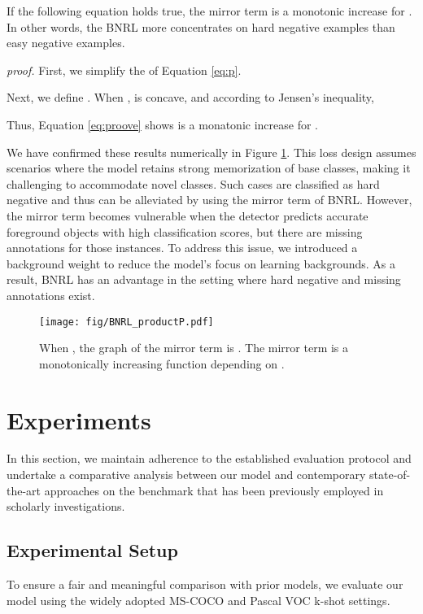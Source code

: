 \documentclass{article}
\begin{document}
If the following equation holds true, the mirror term is a monotonic increase for .
In other words, the BNRL more concentrates on hard negative examples than easy negative examples.



{\it proof.} 
First, we simplify the  of Equation \ref{eq:p}.



Next, we define .
When ,  is concave, and according to Jensen's inequality, 



Thus, Equation \ref{eq:proove} shows  is a monatonic increase for .

We have confirmed these results numerically in Figure \ref{fig:numerical}. This loss design assumes scenarios where the model retains strong memorization of base classes, making it challenging to accommodate novel classes. 
Such cases are classified as hard negative and thus can be alleviated by using the mirror term of BNRL.
However, the mirror term becomes vulnerable when the detector predicts accurate foreground objects with high classification scores, but there are missing annotations for those instances. To address this issue, we introduced a background weight  to reduce the model's focus on learning backgrounds. 
As a result, BNRL has an advantage in the setting where hard negative and missing annotations exist.

\begin{figure}[h]
    \centering
    \texttt{[image: fig/BNRL\_productP.pdf]}
\caption{When , the graph of the mirror term is . The mirror term is a monotonically increasing function depending on . 
}
\label{fig:numerical}
\end{figure}

\medskip

\section{Experiments}
In this section, we maintain adherence to the established evaluation protocol \cite{tfa} and undertake a comparative analysis between our model and contemporary state-of-the-art approaches on the benchmark that has been previously employed in scholarly investigations.

\subsection{Experimental Setup}
To ensure a fair and meaningful comparison with prior models, we evaluate our model using the widely adopted MS-COCO \cite{coco} and Pascal VOC \cite{voc} k-shot settings.
\end{document}
